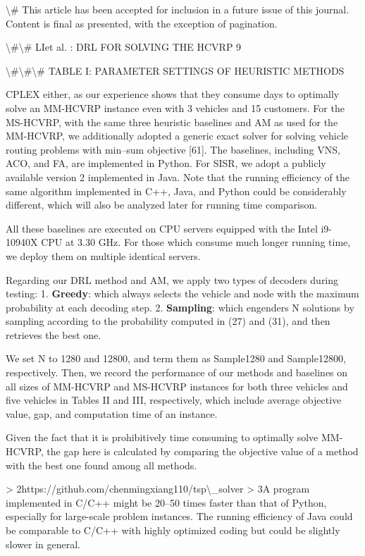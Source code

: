 \documentclass{article}
\begin{document}
	\textbackslash{}# This article has been accepted for inclusion in a future issue of this journal. Content is final as presented, with the exception of pagination.
	
	\textbackslash{}#\textbackslash{}# LIet al. : DRL FOR SOLVING THE HCVRP 9
	
	\textbackslash{}#\textbackslash{}#\textbackslash{}# TABLE I: PARAMETER SETTINGS OF HEURISTIC METHODS
	
	CPLEX either, as our experience shows that they consume days to optimally solve an MM-HCVRP instance even with 3 vehicles and 15 customers. For the MS-HCVRP, with the same three heuristic baselines and AM as used for the MM-HCVRP, we additionally adopted a generic exact solver for solving vehicle routing problems with min–sum objective [61]. The baselines, including VNS, ACO, and FA, are implemented in Python. For SISR, we adopt a publicly available version 2 implemented in Java. Note that the running efficiency of the same algorithm implemented in C++, Java, and Python could be considerably different, which will also be analyzed later for running time comparison.
	
	All these baselines are executed on CPU servers equipped with the Intel i9-10940X CPU at 3.30 GHz. For those which consume much longer running time, we deploy them on multiple identical servers.
	
	Regarding our DRL method and AM, we apply two types of decoders during testing:
	1. \textbf{Greedy}: which always selects the vehicle and node with the maximum probability at each decoding step.
	2. \textbf{Sampling}: which engenders N solutions by sampling according to the probability computed in (27) and (31), and then retrieves the best one.
	
	We set N to 1280 and 12800, and term them as Sample1280 and Sample12800, respectively. Then, we record the performance of our methods and baselines on all sizes of MM-HCVRP and MS-HCVRP instances for both three vehicles and five vehicles in Tables II and III, respectively, which include average objective value, gap, and computation time of an instance.
	
	Given the fact that it is prohibitively time consuming to optimally solve MM-HCVRP, the gap here is calculated by comparing the objective value of a method with the best one found among all methods.
	
	> 2https://github.com/chenmingxiang110/tsp\textbackslash{}_solver  
	> 3A program implemented in C/C++ might be 20–50 times faster than that of Python, especially for large-scale problem instances. The running efficiency of Java could be comparable to C/C++ with highly optimized coding but could be slightly slower in general.
	
\end{document}
